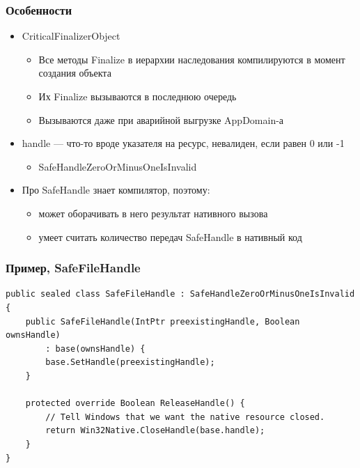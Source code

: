 \documentclass[xetex,mathserif,serif]{beamer}
\begin{document}
    \begin{frame}
        \frametitle{Особенности}
        \begin{itemize}
            \item CriticalFinalizerObject
            \begin{itemize}
                \item Все методы Finalize в иерархии наследования компилируются в момент создания объекта
                \item Их Finalize вызываются в последнюю очередь
                \item Вызываются даже при аварийной выгрузке AppDomain-а
            \end{itemize}
            \item handle --- что-то вроде указателя на ресурс, невалиден, если равен 0 или -1
            \begin{itemize}
                \item SafeHandleZeroOrMinusOneIsInvalid
            \end{itemize}
            \item Про SafeHandle знает компилятор, поэтому:
            \begin{itemize}
                \item может оборачивать в него результат нативного вызова
                \item умеет считать количество передач SafeHandle в нативный код
            \end{itemize}
        \end{itemize}
    \end{frame}

    \begin{frame}[fragile]
        \frametitle{Пример, SafeFileHandle}
        \begin{scriptsize}
            \begin{verbatim}
public sealed class SafeFileHandle : SafeHandleZeroOrMinusOneIsInvalid {
    public SafeFileHandle(IntPtr preexistingHandle, Boolean ownsHandle)
        : base(ownsHandle) {
        base.SetHandle(preexistingHandle);
    }

    protected override Boolean ReleaseHandle() {
        // Tell Windows that we want the native resource closed.
        return Win32Native.CloseHandle(base.handle);
    }
}
            \end{verbatim}
        \end{scriptsize}
    \end{frame}
\end{document}

